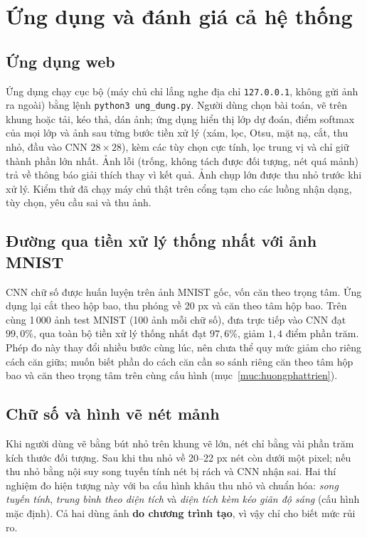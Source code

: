 \chapter{Ứng dụng và đánh giá cả hệ thống}
\label{chuong:tichhop}

\section{Ứng dụng web}
Ứng dụng chạy cục bộ (máy chủ chỉ lắng nghe địa chỉ \texttt{127.0.0.1}, không gửi ảnh ra ngoài) bằng lệnh \texttt{python3 ung\_dung.py}. Người dùng chọn bài toán, vẽ trên khung hoặc tải, kéo thả,
dán ảnh; ứng dụng hiển thị lớp dự đoán, điểm softmax của mọi lớp và ảnh sau từng bước tiền xử lý (xám, lọc, Otsu, mặt nạ, cắt, thu nhỏ, đầu vào CNN $28\times28$), kèm các tùy chọn cực tính, lọc trung vị
và chỉ giữ thành phần lớn nhất. Ảnh lỗi (trống, không tách được đối tượng, nét quá mảnh) trả về thông báo giải thích thay vì kết quả. Ảnh chụp lớn được thu nhỏ trước khi xử lý.
Kiểm thử đã chạy máy chủ thật trên cổng tạm cho các luồng nhận dạng, tùy chọn, yêu cầu sai và thu ảnh.

\section{Đường qua tiền xử lý thống nhất với ảnh MNIST}
\label{muc:duongtienxuly}
CNN chữ số được huấn luyện trên ảnh MNIST gốc, vốn căn theo trọng tâm. Ứng dụng lại cắt theo hộp bao, thu phóng về 20 px và căn theo tâm hộp bao. Trên cùng 1\,000 ảnh test MNIST (100 ảnh mỗi chữ số),
đưa trực tiếp vào CNN đạt $99{,}0\%$, qua toàn bộ tiền xử lý thống nhất đạt $97{,}6\%$, giảm $1{,}4$ điểm phần trăm. Phép đo này thay đổi nhiều bước cùng lúc, nên chưa thể quy mức giảm cho riêng cách căn giữa;
muốn biết phần do cách căn cần so sánh riêng căn theo tâm hộp bao và căn theo trọng tâm trên cùng cấu hình (mục~\ref{muc:huongphattrien}).

\section{Chữ số và hình vẽ nét mảnh}
\label{muc:netmanh}
Khi người dùng vẽ bằng bút nhỏ trên khung vẽ lớn, nét chỉ bằng vài phần trăm kích thước đối tượng. Sau khi thu nhỏ về 20--22 px nét còn dưới một pixel; nếu thu nhỏ bằng nội suy song tuyến tính
nét bị rách và CNN nhận sai. Hai thí nghiệm đo hiện tượng này với ba cấu hình khâu thu nhỏ và chuẩn hóa: \emph{song tuyến tính}, \emph{trung bình theo diện tích} và \emph{diện tích kèm kéo giãn độ sáng}
(cấu hình mặc định). Cả hai dùng ảnh \textbf{do chương trình tạo}, vì vậy chỉ cho biết mức rủi ro.

